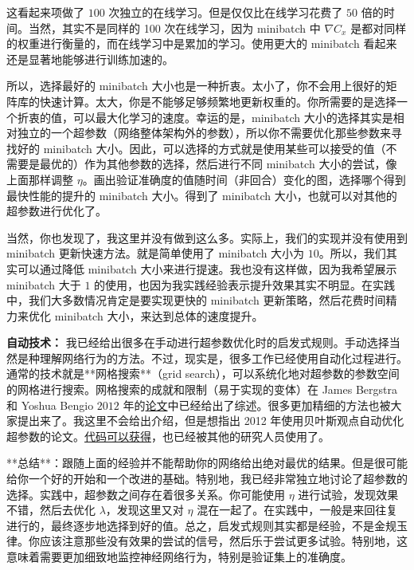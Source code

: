 这看起来项做了 $100$ 次独立的在线学习。但是仅仅比在线学习花费了 $50$ 倍的时间。当然，其实不是同样的 100 次在线学习，因为 minibatch 中 $\nabla C_x$ 是都对同样的权重进行衡量的，而在线学习中是累加的学习。使用更大的 minibatch 看起来还是显著地能够进行训练加速的。

所以，选择最好的 minibatch 大小也是一种折衷。太小了，你不会用上很好的矩阵库的快速计算。太大，你是不能够足够频繁地更新权重的。你所需要的是选择一个折衷的值，可以最大化学习的速度。幸运的是，minibatch 大小的选择其实是相对独立的一个超参数（网络整体架构外的参数），所以你不需要优化那些参数来寻找好的 minibatch 大小。因此，可以选择的方式就是使用某些可以接受的值（不需要是最优的）作为其他参数的选择，然后进行不同 minibatch 大小的尝试，像上面那样调整 $\eta$。画出验证准确度的值随时间（非回合）变化的图，选择哪个得到最快性能的提升的 minibatch 大小。得到了 minibatch 大小，也就可以对其他的超参数进行优化了。

当然，你也发现了，我这里并没有做到这么多。实际上，我们的实现并没有使用到 minibatch 更新快速方法。就是简单使用了 minibatch 大小为 $10$。所以，我们其实可以通过降低 minibatch 大小来进行提速。我也没有这样做，因为我希望展示 minibatch 大于 $1$ 的使用，也因为我实践经验表示提升效果其实不明显。在实践中，我们大多数情况肯定是要实现更快的 minibatch 更新策略，然后花费时间精力来优化 minibatch 大小，来达到总体的速度提升。

\textbf{自动技术：} 我已经给出很多在手动进行超参数优化时的启发式规则。手动选择当然是种理解网络行为的方法。不过，现实是，很多工作已经使用自动化过程进行。通常的技术就是**网格搜索**（grid search），可以系统化地对超参数的参数空间的网格进行搜索。网格搜索的成就和限制（易于实现的变体）在 James Bergstra 和 Yoshua Bengio $2012$ 年的\href{http://papers.nips.cc/paper/4522-practical-bayesian-optimization-of-machine-learning-algorithms.pdf}{论文}中已经给出了综述。很多更加精细的方法也被大家提出来了。我这里不会给出介绍，但是想指出 2012 年使用贝叶斯观点自动优化超参数的论文。\href{https://github.com/jaberg/hyperopt}{代码可以获得}，也已经被其他的研究人员使用了。

**总结**：跟随上面的经验并不能帮助你的网络给出绝对最优的结果。但是很可能给你一个好的开始和一个改进的基础。特别地，我已经非常独立地讨论了超参数的选择。实践中，超参数之间存在着很多关系。你可能使用 $\eta$ 进行试验，发现效果不错，然后去优化 $\lambda$，发现这里又对 $\eta$ 混在一起了。在实践中，一般是来回往复进行的，最终逐步地选择到好的值。总之，启发式规则其实都是经验，不是金规玉律。你应该注意那些没有效果的尝试的信号，然后乐于尝试更多试验。特别地，这意味着需要更加细致地监控神经网络行为，特别是验证集上的准确度。

